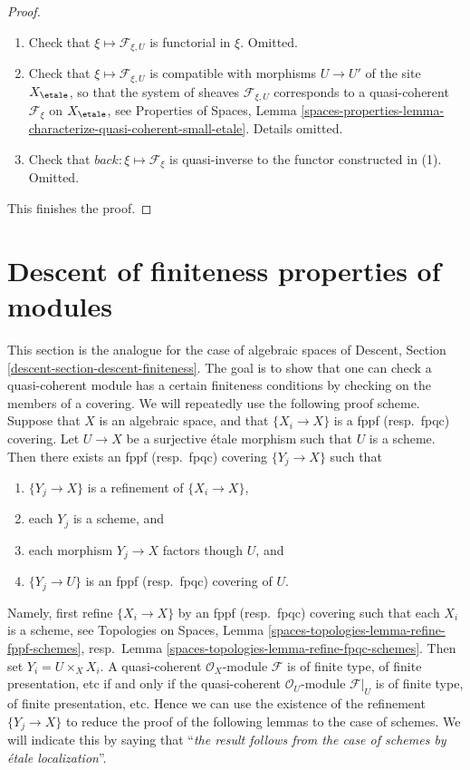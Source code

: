 \begin{proof}
\begin{enumerate}
\item Check that $\xi \mapsto \mathcal{F}_{\xi, U}$ is functorial in $\xi$.
Omitted.
\item Check that $\xi \mapsto \mathcal{F}_{\xi, U}$ is compatible
with morphisms $U \to U'$ of the site $X_\etale$, so that
the system of sheaves $\mathcal{F}_{\xi, U}$ corresponds to a quasi-coherent
$\mathcal{F}_\xi$ on $X_\etale$, see
Properties of Spaces,
Lemma \ref{spaces-properties-lemma-characterize-quasi-coherent-small-etale}.
Details omitted.
\item Check that $back : \xi \mapsto \mathcal{F}_\xi$ is quasi-inverse
to the functor constructed in (1). Omitted.
\end{enumerate}
This finishes the proof.
\end{proof}





\section{Descent of finiteness properties of modules}
\label{section-descent-finiteness}

\noindent
This section is the analogue for the case of algebraic spaces of
Descent, Section \ref{descent-section-descent-finiteness}.
The goal is to show that one can check a quasi-coherent module
has a certain finiteness conditions by checking on the members of
a covering. We will repeatedly use the following proof scheme.
Suppose that $X$ is an algebraic space, and that $\{X_i \to X\}$
is a fppf (resp.\ fpqc) covering. Let $U \to X$ be a surjective
\'etale morphism such that $U$ is a scheme. Then there exists an
fppf (resp.\ fpqc) covering $\{Y_j \to X\}$ such that
\begin{enumerate}
\item $\{Y_j \to X\}$ is a refinement of $\{X_i \to X\}$,
\item each $Y_j$ is a scheme, and
\item each morphism $Y_j \to X$ factors though $U$, and
\item $\{Y_j \to U\}$ is an fppf (resp.\ fpqc) covering of $U$.
\end{enumerate}
Namely, first refine $\{X_i \to X\}$ by an fppf (resp.\ fpqc)
covering such that each $X_i$ is a scheme, see
Topologies on Spaces, Lemma \ref{spaces-topologies-lemma-refine-fppf-schemes},
resp.\ Lemma \ref{spaces-topologies-lemma-refine-fpqc-schemes}.
Then set $Y_i = U \times_X X_i$. A quasi-coherent
$\mathcal{O}_X$-module $\mathcal{F}$ is of finite type, of
finite presentation, etc if and only if the quasi-coherent
$\mathcal{O}_U$-module $\mathcal{F}|_U$ is of finite type, of
finite presentation, etc. Hence we can use the existence of the
refinement $\{Y_j \to X\}$ to reduce the proof of the following
lemmas to the case of schemes. We will indicate this by saying
that ``{\it the result follows from the case of schemes by
\'etale localization}''.


